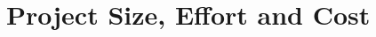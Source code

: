 \documentclass[../../projectPlan.tex]{subfiles}
\begin{document}
	\chapter{Project Size, Effort and Cost}	

		

		
\end{document}
